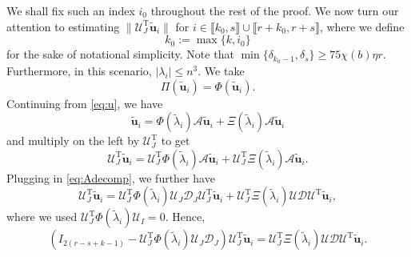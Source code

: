 \documentclass[reqno]{amsart}
\newcommand{\T}{\mathrm{T}}
\theoremstyle{plain}
\theoremstyle{definition}
\begin{document}
We shall fix such an index $i_0$  throughout the rest of the proof. We now turn our attention to estimating $\| \mathcal U_J^\T \widetilde{\mathbf u}_i \|$  for $i\in \llbracket k_0, s\rrbracket\cup \llbracket r+k_0, r+s\rrbracket$, where we define $$k_0:=\max\{ k,i_0\}$$ for the sake of notational simplicity. Note that $\min\{\delta_{k_0-1},\delta_s\} \ge 75 \chi(b) \eta r$. Furthermore, in this scenario, $|\lambda_i | \le n^3$. We take $$\Pi(\widetilde{\mathbf u}_i) = \Phi(\widetilde{\mathbf u}_i).$$ 
Continuing from \eqref{eq:u}, we have
\begin{equation*}
\widetilde{\mathbf u}_i=\Phi(\widetilde \lambda_i) \mathcal A \widetilde{\mathbf u}_i + \Xi(\widetilde \lambda_i)  \mathcal A \widetilde{\mathbf u}_i
\end{equation*}
and multiply on the left by $\mathcal U_J^\T$ to get
\begin{equation}\label{eq:middle}
\mathcal U_J^\T \widetilde{\mathbf u}_i = \mathcal U_J^\T \Phi(\widetilde \lambda_i) \mathcal A \widetilde{\mathbf u}_i + \mathcal U_J^\T \Xi(\widetilde \lambda_i) \mathcal A \widetilde{\mathbf u}_i.
\end{equation}
Plugging in \eqref{eq:Adecomp}, we further have
\begin{equation*}
\mathcal U_J^\T \widetilde{\mathbf u}_i = \mathcal U_J^\T \Phi(\widetilde \lambda_i) {\mathcal U}_J {\mathcal D}_J {\mathcal U}_J^\T \widetilde{\mathbf u}_i + \mathcal U_J^\T \Xi(\widetilde \lambda_i) {\mathcal U} {\mathcal D} {\mathcal U}^\T \widetilde{\mathbf u}_i,
\end{equation*}
where we used $\mathcal U_J^\T \Phi(\widetilde \lambda_i) \mathcal U_{I}=0$.  Hence, 
\begin{equation} \label{eq:recursive}
\left( I_{2(r-s+k-1)} - \mathcal U_J^\T \Phi(\widetilde \lambda_i) {\mathcal U}_J {\mathcal D}_J \right) \mathcal U_J^\T \widetilde{\mathbf u}_i = \mathcal U_J^\T \Xi(\widetilde \lambda_i) {\mathcal U} {\mathcal D} {\mathcal U}^\T \widetilde{\mathbf u}_i.
\end{equation}
\end{document}
